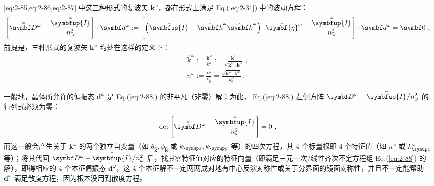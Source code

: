 \cref{eq:2-85,eq:2-86,eq:2-87} 中这三种形式的复波矢 ${\symbf k}^\omega$，都在形式上满足 Eq.(\ref{eq:2-31}) 中的波动方程：
\begin{equation} \label{eq:2-88}
	\left[ \bar{\bar{\symbf D}}^{\omega} - \frac{ \bar{\bar{\symbfup{I}}} }{ n^2_\omega } \right] \cdot \symbf d^{\omega} := \left[ \left( \bar{\bar{\symbfup{I}}} - \hat{\symbf k}^{\omega} \hat{\symbf k}^{\omega} \right) \cdot \bar{\bar{\symbf{\eta}}}^{\omega} - \frac{ \bar{\bar{\symbfup{I}}} }{ n^2_\omega } \right] \cdot \symbf d^{\omega} = \symbf 0 ~,
\end{equation}
前提是，三种形式的复波矢 ${\symbf k}^\omega$ 均处在这样的定义下：
\begin{subequations} \label{eq:2-89}
\begin{align}
	\hat{\symbf k}^\omega := \frac{ {\symbf k}^\omega }{ k^\omega } := \frac{ {\symbf k}^\omega }{ \sqrt{{\symbf k}^\omega \cdot {\symbf k}^\omega} } \label{eq:2-89a}~,\\ n^\omega := \frac{ k^\omega }{ k^\omega_{0} } = \frac{ \sqrt{{\symbf k}^\omega \cdot {\symbf k}^\omega} }{ k^\omega_{0} } \label{eq:2-89b}~.
\end{align}
\end{subequations}

一般地，晶体所允许的偏振态 $\symbf d^{\omega}$ 是 Eq.(\ref{eq:2-88}) 的非平凡（非零）解；为此， Eq.(\ref{eq:2-88}) 左侧方阵 $\bar{\bar{\symbf D}}^{\omega} - \bar{\bar{\symbfup{I}}} \big/ n^2_\omega$ 的行列式必须为零：
\begin{equation} \label{eq:2-90}
	\det \left[ \bar{\bar{\symbf D}}^{\omega} - \frac{ \bar{\bar{\symbfup{I}}} }{ n^2_\omega } \right] = 0 ~,
\end{equation}
而这一般会产生关于 ${\symbf k}^\omega$ 的两个独立自变量（如 $\theta_{\hat{\symbf k}}, \phi_{\hat{\symbf k}}$ 或 $k_{\symup x}, k_{\symup y}$ 等）的四次方程\cite{abdulhalimExactMatrixMethod1999,olyslagerElectromagneticsExoticMedia2002,mcleodVectorFourierOptics2014}，其 4 个标量根即 4 个特征值（如 $n^{\omega}$ 或 $k^{\omega}_{\symup z}$ 等）；将其代回 $\bar{\bar{\symbf D}}^{\omega} - \bar{\bar{\symbfup{I}}} \big/ n^2_\omega$ 后，找其零特征值对应的特征向量（即满足三元一次/线性齐次不定方程组 Eq.(\ref{eq:2-88}) 的解\cite{XieQuanMianHuiYiWas}），即得相应的 4 个本征偏振态 $\symbf d^{\omega}$，这 4 个本征解不一定两两成对地有中心反演对称性\cite{mcleodVectorFourierOptics2014,berryOpticalSingularitiesBirefringent2003}或关于分界面的镜面对称性，并且不一定能帮助 $\symbf d^{\omega}$ 满足散度方程，因为根本没用到散度方程。

